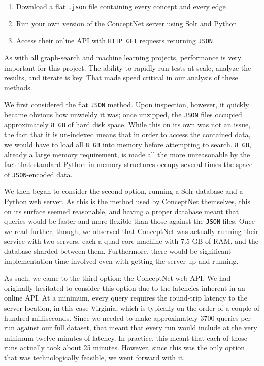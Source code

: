 \documentclass[11pt]{article}
\begin{document}
\begin{enumerate}
\item Download a flat \verb|.json| file containing every concept and every edge
\item Run your own version of the ConceptNet server using Solr and Python
\item Access their online API with \verb|HTTP GET| requests returning \verb|JSON|
\end{enumerate}

As with all graph-search and machine learning projects, performance is very important for this project. The ability to rapidly run tests at scale, analyze the results, and iterate is key. That made speed critical in our analysis of these methods.

We first considered the flat \verb|JSON| method. Upon inspection, however, it quickly became obvious how unwieldy it was; once unzipped, the \verb|JSON| files occupied approximately \verb|8 GB| of hard disk space. While this on its own was not an issue, the fact that it is un-indexed means that in order to access the contained data, we would have to load all \verb|8 GB| into memory before attempting to search. \verb|8 GB|, already a large memory requirement, is made all the more unreasonable by the fact that standard Python in-memory structures occupy several times the space of \verb|JSON|-encoded data.

We then began to consider the second option, running a Solr database and a Python web server. As this is the method used by ConceptNet themselves, this on its surface seemed reasonable, and having a proper database meant that queries would be faster and more flexible than those against the \verb|JSON| files. Once we read further, though, we observed that ConceptNet was actually running their service with two servers, each a quad-core machine with 7.5 GB of RAM, and the database sharded between them. Furthermore, there would be significant implementation time involved even with getting the server up and running.

As such, we came to the third option: the ConceptNet web API. We had originally hesitated to consider this option due to the latencies inherent in an online API. At a minimum, every query requires the round-trip latency to the server location, in this case Virginia, which is typically on the order of a couple of hundred milliseconds. Since we needed to make approximately 3700 queries per run against our full dataset, that meant that every run would include at the very minimum twelve minutes of latency. In practice, this meant that each of those runs actually took about 25 minutes. However, since this was the only option that was technologically feasible, we went forward with it.
\end{document}
